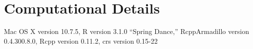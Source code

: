 \section{Computational Details}
\label{append:comp}
Mac OS X version 10.7.5, R version 3.1.0 ``Spring Dance,'' RcppArmadillo version 0.4.300.8.0, Rcpp version 0.11.2, crs version 0.15-22